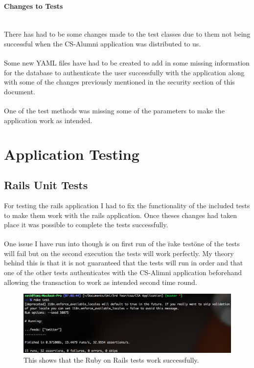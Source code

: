 \documentclass{article}
\newcommand{\myparagraph}[1]{\paragraph{#1}\mbox{}\\}
\begin{document}
\myparagraph{Changes to Tests}

There has had to be some changes made to the test classes due to them not being successful when the CS-Alumni application was distributed to us.\\
\\
Some new YAML files have had to be created to add in some missing information for the database to authenticate the user successfully with the application along with some of the changes previously mentioned in the security section of this document.\\
\\
One of the test methods was missing some of the parameters to make the application work as intended.

\newpage
\section{Application Testing}

\subsection{Rails Unit Tests}

For testing the rails application I had to fix the functionality of the included tests to make them work with the rails application. Once theses changes had taken place it was possible to complete the tests successfully.\\
\\
One issue I have run into though is on first run of the \"rake test\" one of the tests will fail but on the second execution the tests will work perfectly. My theory behind this is that it is not guaranteed that the tests will run in order and that one of the other tests authenticates with the CS-Alimni application beforehand allowing the transaction to work as intended second time round.

\begin{figure}[H]
\centering
\includegraphics[width=\textwidth]{railstests}
\caption{This shows that the Ruby on Rails tests work successfully.}
\end{figure}
\end{document}
